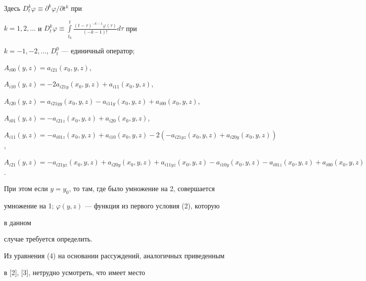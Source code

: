 Здесь $D^k_t\varphi\equiv\partial^k\varphi/\partial t^k$ при 


$k=1,2,\dotsc$ и $D^k_t\varphi\equiv \int\limits^t_{t_0} 


\frac{(t-\tau)^{-k-1}\varphi(\tau)}{(-k-1)!}d\tau$ при


$k=-1,-2,\dotsc$, $D^0_t$ --- единичный оператор; 


 


$A_{i00}(y,z)=a_{i21}(x_0,y,z)$, 


$A_{i10}(y,z)=-2a_{i21y}(x_0,y,z)+a_{i11}(x_0,y,z)$, 


 


$A_{i20}(y,z)=a_{i21yy}(x_0,y,z)-a_{i11y}(x_0,y,z)+ a_{i00}(x_0,y,z)$, 


 


$A_{i01}(y,z)=-a_{i21z}(x_0,y,z)+a_{i20}(x_0,y,z)$, 


 


$A_{i11}(y,z)=-a_{i01z}(x_0,y,z)+a_{i10}(x_0,y,z)- 


2(-a_{i21yz}(x_0,y,z)+a_{i20y}(x_0,y,z))$, 


 


$A_{i21}(y,z)=-a_{i21yz}(x_0,y,z)+a_{i20y}(x_0,y,z)+ 


a_{i11yz}(x_0,y,z)-a_{i10y}(x_0,y,z)- a_{i01z}(x_0,y,z)+a_{i00}(x_0,y,z)$. 


 


При этом если $y=y_0$, то там, где было умножение на 2, совершается 


умножение на 1; $\varphi(y,z)$ --- функция из первого условия (2), которую 


в данном 


случае требуется определить. 


 


Из уравнения (4) на основании рассуждений, аналогичных приведенным 


в [2], [3], нетрудно усмотреть, что имеет место 


 


